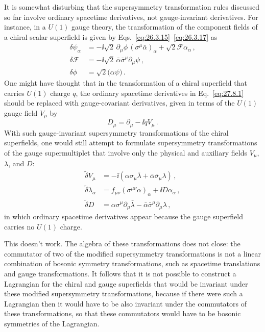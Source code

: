 It is somewhat disturbing that the supersymmetry transformation rules
discussed so far involve ordinary spacetime derivatives, not gauge-invariant
derivatives. For instance, in a \(U(1)\) gauge theory, the transformation of
the component fields of a chiral scalar superfield is given by
Eqs.~\eqref{eq:26.3.15}--\eqref{eq:26.3.17} as
\begin{equation}
  \begin{aligned}
    \delta\psi_\alpha
    &=-\ii\sqrt{2}\,\partial_\mu\phi\,
      (\sigma^\mu\bar\alpha)_\alpha
      +\sqrt{2}\mathcal{F}\alpha_\alpha\,,\\
    \delta\mathcal{F}
    &=-\ii\sqrt{2}\,
      \bar\alpha\bar\sigma^\mu\partial_\mu\psi\,,\\
    \delta\phi
    &=\sqrt{2}\bigl(\alpha\psi\bigr)\,.
  \end{aligned}
  \tag{27.8.1}\label{eq:27.8.1}
\end{equation}
One might have thought that in the transformation of a chiral superfield
that carries \(U(1)\) charge \(q\), the ordinary spacetime derivatives in
Eq.~\eqref{eq:27.8.1} should be replaced with gauge-covariant derivatives,
given in terms of the \(U(1)\) gauge field \(V_\mu\) by
\begin{equation}
  D_\mu=\partial_\mu-\ii qV_\mu\,.
  \tag{27.8.2}\label{eq:27.8.2}
\end{equation}
With such gauge-invariant supersymmetry transformations of the chiral
superfields, one would still attempt to formulate supersymmetry
transformations of the gauge supermultiplet that involve only the physical
and auxiliary fields \(V_\mu\), \(\lambda\), and \(D\):
\begin{equation}
  \begin{aligned}
    \widetilde{\delta}V_\mu
    &=-\ii\left(
      \alpha\sigma_\mu\bar\lambda
      +\bar\alpha\bar\sigma_\mu\lambda\right)\,,\\
    \widetilde{\delta}\lambda_\alpha
    &=f_{\mu\nu}(\sigma^{\mu\nu}\alpha)_\alpha
      +\ii D\alpha_\alpha\,,\\
    \widetilde{\delta}D
    &=\alpha\sigma^\mu\partial_\mu\bar\lambda
      -\bar\alpha\bar\sigma^\mu\partial_\mu\lambda\,,
  \end{aligned}
  \tag{27.8.3}\label{eq:27.8.3}
\end{equation}
in which ordinary spacetime derivatives appear because the gauge superfield
carries no \(U(1)\) charge.

This doesn't work. The algebra of these transformations does not close: the
commutator of two of the modified supersymmetry transformations is not a
linear combination of bosonic symmetry transformations, such as spacetime
translations and gauge transformations. It follows that it is not possible
to construct a Lagrangian for the chiral and gauge superfields that would be
invariant under these modified supersymmetry transformations, because if
there were such a Lagrangian then it would have to be also invariant under
the commutators of these transformations, so that these commutators would
have to be bosonic symmetries of the Lagrangian.

